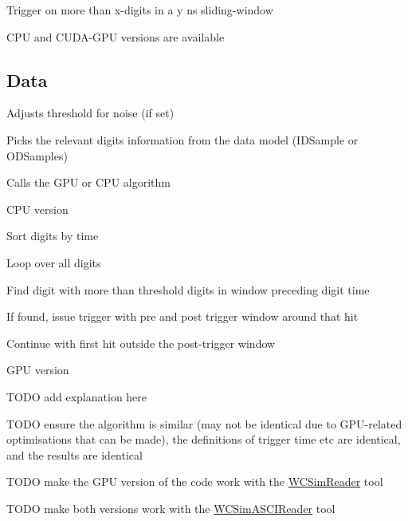 Trigger on more than x-\/digits in a y ns sliding-\/window

C\-P\-U and C\-U\-D\-A-\/\-G\-P\-U versions are available

\subsection*{Data}


\begin{DoxyItemize}
\item Adjusts threshold for noise (if set)
\item Picks the relevant digits information from the data model (I\-D\-Sample or O\-D\-Samples)
\item Calls the G\-P\-U or C\-P\-U algorithm
\begin{DoxyItemize}
\item C\-P\-U version
\begin{DoxyItemize}
\item Sort digits by time
\item Loop over all digits
\item Find digit with more than threshold digits in window preceding digit time
\begin{DoxyItemize}
\item If found, issue trigger with pre and post trigger window around that hit
\item Continue with first hit outside the post-\/trigger window
\end{DoxyItemize}
\end{DoxyItemize}
\item G\-P\-U version
\begin{DoxyItemize}
\item T\-O\-D\-O add explanation here
\item T\-O\-D\-O ensure the algorithm is similar (may not be identical due to G\-P\-U-\/related optimisations that can be made), the definitions of trigger time etc are identical, and the results are identical
\item T\-O\-D\-O make the G\-P\-U version of the code work with the \hyperlink{classWCSimReader}{W\-C\-Sim\-Reader} tool
\end{DoxyItemize}
\end{DoxyItemize}
\item T\-O\-D\-O make both versions work with the \hyperlink{classWCSimASCIReader}{W\-C\-Sim\-A\-S\-C\-I\-Reader} tool
\end{DoxyItemize}

